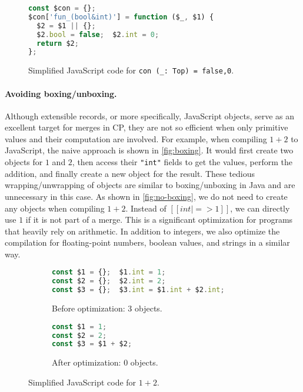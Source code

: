 \begin{figure}
\begin{lstlisting}[language=TypeScript]
const $con = {};
$con['fun_(bool&int)'] = function ($_, $1) {
  $2 = $1 || {};
  $2.bool = false;  $2.int = 0;
  return $2;
};
\end{lstlisting}
\caption{Simplified JavaScript code for \lstinline{con (_: Top) = false,0}.}
\label{fig:con}
\end{figure}

\paragraph{Avoiding boxing/unboxing.} \label{sec:boxing}
Although extensible records, or more specifically, JavaScript objects, serve as
an excellent target for merges in CP, they are not so efficient when only
primitive values and their computation are involved. For example, when compiling
$1 + 2$ to JavaScript, the naive approach is shown in \autoref{fig:boxing}. It
would first create two objects for $1$ and $2$, then access their
\lstinline{"int"} fields to get the values, perform the addition, and finally
create a new object for the result. These tedious wrapping/unwrapping of objects
are similar to boxing/unboxing in Java and are unnecessary in this case. As
shown in \autoref{fig:no-boxing}, we do not need to create any objects when
compiling $1 + 2$. Instead of $[[{int|=>1}]]$, we can directly use $1$ if it is
not part of a merge. This is a significant optimization for programs that
heavily rely on arithmetic. In addition to integers, we also optimize the
compilation for floating-point numbers, boolean values, and strings in a similar
way.

\begin{figure}
\begin{subfigure}{.47\textwidth}
\begin{lstlisting}[language=TypeScript]
const $1 = {};  $1.int = 1;
const $2 = {};  $2.int = 2;
const $3 = {};  $3.int = $1.int + $2.int;
\end{lstlisting}
\caption{Before optimization: 3 objects.} \label{fig:boxing}
\end{subfigure}\hspace{0.1\textwidth}%
\begin{subfigure}{.3\textwidth}
\begin{lstlisting}[language=TypeScript]
const $1 = 1;
const $2 = 2;
const $3 = $1 + $2;
\end{lstlisting}
\caption{After optimization: 0 objects.} \label{fig:no-boxing}
\end{subfigure}
\caption{Simplified JavaScript code for $1 + 2$.}
\end{figure}


